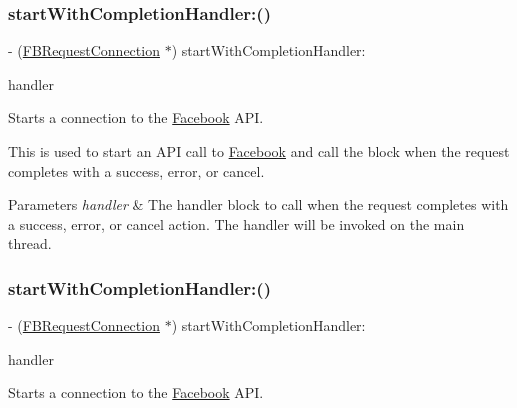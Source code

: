 \subsubsection{\texorpdfstring{start\+With\+Completion\+Handler\+:()}{startWithCompletionHandler:()}\hspace{0.1cm}{\footnotesize\ttfamily [2/5]}}
{\footnotesize\ttfamily -\/ (\hyperlink{interfaceFBRequestConnection}{F\+B\+Request\+Connection} $\ast$) start\+With\+Completion\+Handler\+: \begin{DoxyParamCaption}\item[{(F\+B\+Request\+Handler)}]{handler }\end{DoxyParamCaption}}

Starts a connection to the \hyperlink{interfaceFacebook}{Facebook} A\+PI.

This is used to start an A\+PI call to \hyperlink{interfaceFacebook}{Facebook} and call the block when the request completes with a success, error, or cancel.


\begin{DoxyParams}{Parameters}
{\em handler} & The handler block to call when the request completes with a success, error, or cancel action. The handler will be invoked on the main thread. \\
\hline
\end{DoxyParams}
\mbox{\label{interfaceFBRequest_a40af16a9b68d4e08abd9e022b94df6f0}} 
\subsubsection{\texorpdfstring{start\+With\+Completion\+Handler\+:()}{startWithCompletionHandler:()}\hspace{0.1cm}{\footnotesize\ttfamily [3/5]}}
{\footnotesize\ttfamily -\/ (\hyperlink{interfaceFBRequestConnection}{F\+B\+Request\+Connection} $\ast$) start\+With\+Completion\+Handler\+: \begin{DoxyParamCaption}\item[{(F\+B\+Request\+Handler)}]{handler }\end{DoxyParamCaption}}

Starts a connection to the \hyperlink{interfaceFacebook}{Facebook} A\+PI.

